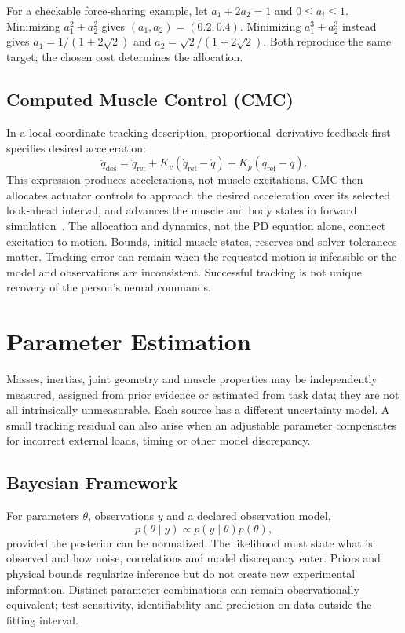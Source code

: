 For a checkable force-sharing example, let $a_1+2a_2=1$ and $0\leq a_i\leq1$.
Minimizing $a_1^2+a_2^2$ gives $(a_1,a_2)=(0.2,0.4)$.
Minimizing $a_1^3+a_2^3$ instead gives
$a_1=1/(1+2\sqrt2)$ and $a_2=\sqrt2/(1+2\sqrt2)$.
Both reproduce the same target; the chosen cost determines the allocation.

\subsection{Computed Muscle Control (CMC)}

In a local-coordinate tracking description, proportional--derivative feedback
first specifies desired acceleration:
\begin{equation}
 \ddot q_{\mathrm{des}}=\ddot q_{\mathrm{ref}}
 +K_v(\dot q_{\mathrm{ref}}-\dot q)+K_p(q_{\mathrm{ref}}-q).
 \label{eq:ch6:cmc}
\end{equation}
This expression produces accelerations, not muscle excitations.
CMC then allocates actuator controls to approach the desired acceleration over
its selected look-ahead interval, and advances the muscle and body states in
forward simulation~\cite{ThelenAndersonDelp2003,OpenSimCMCBiological}.
The allocation and dynamics, not the PD equation alone, connect excitation to
motion. Bounds, initial muscle states, reserves and solver tolerances matter.
Tracking error can remain when the requested motion is infeasible or the model
and observations are inconsistent. Successful tracking is not unique recovery
of the person's neural commands.

\section{Parameter Estimation}

Masses, inertias, joint geometry and muscle properties may be independently
measured, assigned from prior evidence or estimated from task data; they are not
all intrinsically unmeasurable. Each source has a different uncertainty model.
A small tracking residual can also arise when an adjustable parameter compensates
for incorrect external loads, timing or other model discrepancy.

\subsection{Bayesian Framework}

For parameters $\theta$, observations $y$ and a declared observation model,
\begin{equation}
 p(\theta\mid y)\propto p(y\mid\theta)p(\theta),
 \label{eq:ch6:bayes}
\end{equation}
provided the posterior can be normalized.
The likelihood must state what is observed and how noise, correlations and
model discrepancy enter. Priors and physical bounds regularize inference but
do not create new experimental information. Distinct parameter combinations
can remain observationally equivalent; test sensitivity, identifiability and
prediction on data outside the fitting interval.

